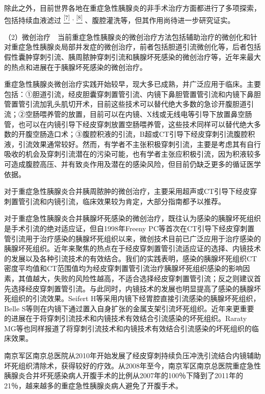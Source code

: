 除此之外，目前世界各地在重症急性胰腺炎的非手术治疗方面都进行了多项探索，包括持续血液滤过
\protect\hyperlink{text00021.htmlux5cux23ch7-20}{\textsuperscript{{[}7{]}}}
\textsuperscript{,}
\protect\hyperlink{text00021.htmlux5cux23ch8-20}{\textsuperscript{{[}8{]}}}
、腹腔灌洗等，但其作用尚待进一步研究证实。

（2）微创治疗　当前重症急性胰腺炎的微创治疗方法包括辅助治疗的微创化和针对重症急性胰腺炎局部并发症的微创治疗，前者包括胆道引流微创化等，后者包括假性囊肿穿刺引流、胰周脓肿穿刺引流和胰腺坏死感染的微创治疗等，近年来最大的热点和进展在于胰腺坏死感染的微创治疗。

重症急性胰腺炎微创治疗实践开始较早，现大多已成熟，并广泛应用于临床。主要包括：①胆道引流，经皮胆囊穿刺置管引流、内镜下鼻胆管置管引流和内镜下鼻胆管置管引流加乳头肌切开术，目前这些技术可以替代绝大多数的急诊开腹胆道引流；②空肠喂养管的放置，目前可以在内镜、X线或无线电等引导下放置鼻空肠管，也可以在内镜引导下经皮穿刺放置空肠喂养管，这些技术同样可以替代绝大多数的开腹空肠造口术；③腹腔积液的引流，B超或CT引导下经皮穿刺引流腹腔积液，引流效果通常较好。然而，有学者不主张积极穿刺引流，主要是考虑其有自行吸收的机会及穿刺引流潜在的污染可能，也有学者主张应积极引流，因为积液较多可造成腹腔高压、并有致炎作用及潜在的感染风险，但目前仍缺乏更多的循证医学依据。

对于重症急性胰腺炎合并胰周脓肿的微创治疗，主要采用超声或CT引导下经皮穿刺置管引流和内镜引流，临床效果较为肯定，大部分指南都予以推荐。

对于重症急性胰腺炎合并胰腺坏死感染的微创治疗，既往认为感染的胰腺坏死组织是手术引流的绝对适应证，但自1998年Freeny
PC等首次在CT引导下经皮穿刺置管引流用于治疗感染的胰腺坏死组织以来，微创技术目前已广泛应用于治疗感染的胰腺坏死组织。近年来聚焦的热点在于经皮穿刺置管引流适应证的选择、内镜技术的发展以及各种引流技术的有效结合。我们的实践表明，感染的胰腺坏死组织CT密度平均值和CT范围值均为经皮穿刺置管引流治疗胰腺坏死组织感染的影响因素，其值越大，失败的风险性越高，不适合选择经皮穿刺置管引流；反之则建议首先选择经皮穿刺置管引流。与此同时，内镜技术的发展也明显提高了感染的胰腺坏死组织的引流效果。Seifert
H等采用内镜下经胃腔直接引流感染的胰腺坏死组织，Belle
S等则在内镜下通过置入自身扩张的金属支架引流坏死组织。近年来更重要的进展在于将穿刺引流技术和内镜技术有效结合引流感染的坏死组织。Raraty
MG等也同样报道了将穿刺引流技术和内镜技术有效结合引流感染的坏死组织的临床效果。

南京军区南京总医院从2010年开始发展了经皮穿刺持续负压冲洗引流结合内镜辅助坏死组织清除术，获得较好的疗效。从2008年至今，南京军区南京总医院重症急性胰腺炎合并坏死感染病人开腹手术的比例从2007年的100％下降到了2011年的21％，越来越多的重症急性胰腺炎病人避免了开腹手术。

